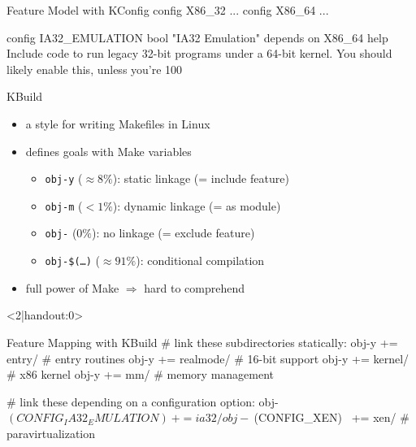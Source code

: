 \begin{frame}[fragile,t]{\myframetitle}
	\vspace*{-2ex}
	\begin{fancycolumns}[t]
		\begin{kconfigtight}[basicstyle=\footnotesize]{Feature Model with KConfig}
config X86_32 ...
config X86_64 ...

config IA32_EMULATION
	bool "IA32 Emulation"
	depends on X86_64
	help Include code to run legacy 32-bit programs under a 64-bit kernel. You should likely enable this, unless you're 100%
\end{kconfigtight}
		\begin{definition}{KBuild}
			\begin{itemize}
				\item a style for writing Makefiles in Linux
				\item defines goals with Make variables
				\begin{itemize}
					\small
					\item \texttt{obj-y} ($\approx 8\%$): static linkage (= include feature)
					\item \texttt{obj-m} ($< 1\%$): dynamic linkage (= as module)
					\item \texttt{obj-} ($0\%$): no linkage (= exclude feature)
					\item \texttt{obj-\$(\ldots)} ($\approx 91\%$): conditional compilation
				\end{itemize}
				\item full power of Make $\Rightarrow$ hard to comprehend
			\end{itemize}
		\end{definition}
	\nextcolumn
		\begin{onlyenv}<2|handout:0>
			\begin{kbuildtight}[basicstyle=\small]{Feature Mapping with KBuild }
# link these subdirectories statically:
obj-y += entry/ # entry routines
obj-y += realmode/ # 16-bit support
obj-y += kernel/ # x86 kernel
obj-y += mm/ # memory management

# link these depending on a configuration option:
obj-~$(CONFIG_IA32_EMULATION)~ += ia32/
obj-~$(CONFIG_XEN)~ += xen/ # paravirtualization



\end{kbuildtight}
\end{onlyenv}
\end{fancycolumns}
\end{frame}
